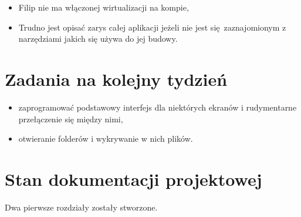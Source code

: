 \documentclass[12pt,a4paper]{mwart}
\begin{document}
\begin{itemize}
	\item Filip nie ma włączonej wirtualizacji na kompie,
	\item Trudno jest opisać zarys całej aplikacji jeżeli nie jest się zaznajomionym z narzędziami jakich się używa do jej budowy.
\end{itemize}

\section{Zadania na kolejny tydzień}

\begin{itemize}
	\item zaprogramować podstawowy interfejs dla niektórych ekranów i rudymentarne przełączenie się między nimi,
	\item otwieranie folderów i wykrywanie w nich plików.
\end{itemize}

\section{Stan dokumentacji projektowej}

Dwa pierwsze rozdziały zostały stworzone.
\end{document}
